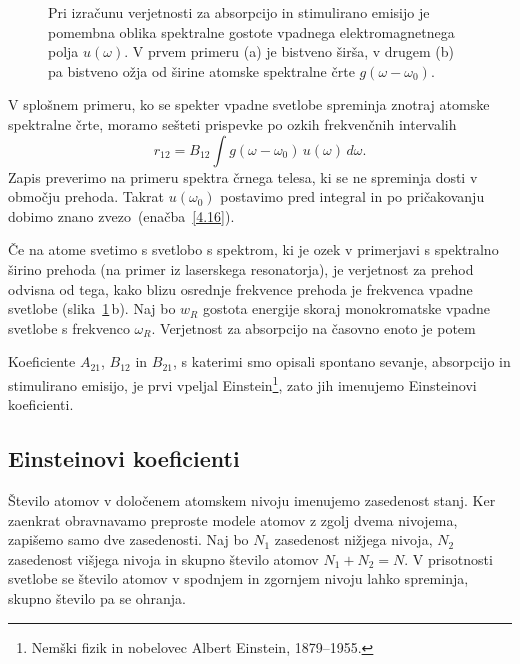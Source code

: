 \begin{figure}[h]
\centering
\def\svgwidth{140truemm} 

\caption{Pri izračunu verjetnosti za absorpcijo in stimulirano emisijo je 
pomembna oblika spektralne gostote vpadnega elektromagnetnega polja $u(\omega)$. V prvem primeru (a) je 
bistveno širša, v drugem (b) pa bistveno ožja od širine atomske spektralne črte $g(\omega-\omega_0)$.}
\label{fig:spektri}
\end{figure}

V splošnem primeru, ko se spekter vpadne svetlobe spreminja znotraj 
atomske spektralne črte, moramo sešteti prispevke po ozkih frekvenčnih intervalih
\begin{equation}
r_{12}=B_{12}\int g(\omega-\omega_0)\, u(\omega)\, d\omega.
\label{4.19}
\end{equation}
Zapis preverimo na primeru spektra črnega telesa, ki se ne spreminja 
dosti v območju prehoda. Takrat $u(\omega_0)$ postavimo pred integral in po pričakovanju
dobimo znano zvezo~(enačba~\ref{4.16}). 

Če na atome svetimo s svetlobo s spektrom, ki je ozek v primerjavi s spektralno 
širino prehoda (na primer iz laserskega resonatorja), je verjetnost za prehod 
odvisna od tega, kako blizu osrednje frekvence prehoda je frekvenca vpadne 
svetlobe (slika~\ref{fig:spektri}\,b). Naj bo  $w_{R}$ gostota energije skoraj
monokromatske vpadne svetlobe s frekvenco $\omega_R$. Verjetnost za absorpcijo na časovno 
enoto je potem  

Koeficiente $A_{21}$, $B_{12}$ in $B_{21}$, s katerimi smo opisali spontano sevanje,
absorpcijo in stimulirano emisijo, je prvi vpeljal Einstein\footnote{Nemški fizik
in nobelovec Albert Einstein, 1879--1955.}, zato jih imenujemo 
Einsteinovi koeficienti. 

\subsection*{Einsteinovi koeficienti}
\label{AB}
Število atomov v določenem atomskem nivoju imenujemo zasedenost stanj. 
Ker zaenkrat obravnavamo preproste modele atomov z zgolj 
dvema nivojema, zapišemo samo dve zasedenosti. Naj bo $N_1$ zasedenost 
nižjega nivoja, $N_{2}$ zasedenost višjega nivoja in skupno število atomov 
$N_1+N_2=N$. V prisotnosti svetlobe se število atomov v spodnjem in zgornjem 
nivoju lahko spreminja, skupno število pa se ohranja.

